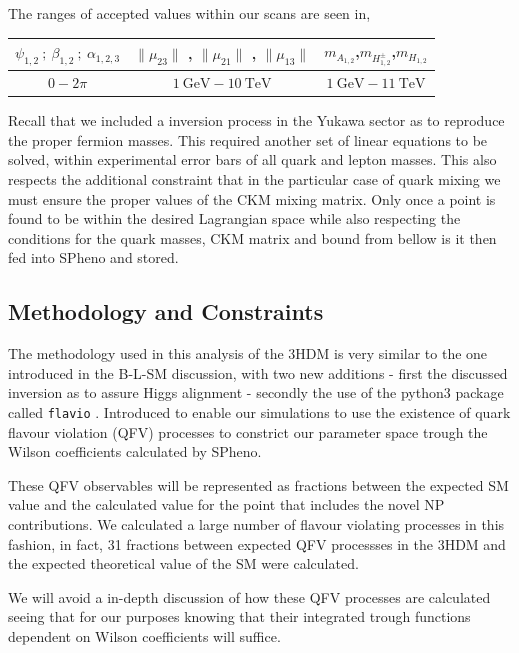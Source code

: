 \documentclass[10pt]{book}
\renewcommand{\(}{\left(}
\renewcommand{\)}{\right)}
\renewcommand{\[}{\left[}
\renewcommand{\]}{\right]}
\begin{document}
The ranges of accepted values within our scans are seen in,
%
\begin{table}[H]
\centering
\begin{tabular}{ccc}
$\psi_{1,2} \ ; \ \beta_{1,2} \ ;\  \alpha_{1,2,3}$ & $\|\mu_{23}\|$ , $\|\mu_{21}\|$ , $\|\mu_{13}\|$ &  $m_{A_{1,2}}$,$m_{H_{1,2}^\pm}$,$m_{H_{1,2}}$ \\ \hline
$0- 2\pi$    & $1 \ \text{GeV} - 10 \ \text{TeV}$ & $1 \ \text{GeV} - 11 \ \text{TeV}$   
\end{tabular}
\end{table}

Recall that we included a inversion process in the Yukawa sector as to reproduce the proper fermion masses. 
% 
This required another set of linear equations to be solved, within experimental error bars of all quark and lepton masses.
% 
This also respects the additional constraint that in the particular case of quark mixing we must ensure the proper values of the CKM mixing matrix.  
%
Only once a point is found to be within the desired Lagrangian space while also respecting the conditions for the quark masses, CKM matrix and bound from bellow is it then fed into SPheno and stored. 
%
\subsection{Methodology and Constraints}

The  methodology used in this analysis of the 3HDM is very similar to the one introduced in the B-L-SM discussion, with two new additions - first the discussed inversion as to assure Higgs alignment - secondly the use of the python3 package called \texttt{flavio}  \cite{straub2018flavio}. 
%
Introduced to enable our simulations to use the existence of quark flavour violation (QFV) processes to constrict our parameter space trough the Wilson coefficients calculated by SPheno. 

These QFV observables will be represented as fractions between the expected SM value and the calculated value for the point that includes the novel NP contributions. 
%
We calculated a large number of flavour violating processes in this fashion, in fact, 31 fractions between expected QFV processses in the 3HDM and the expected theoretical value of the SM were calculated. 
%

We will avoid a in-depth discussion of how these QFV processes are calculated seeing that for our purposes knowing that their integrated trough functions dependent on Wilson coefficients will suffice. %
\end{document}
